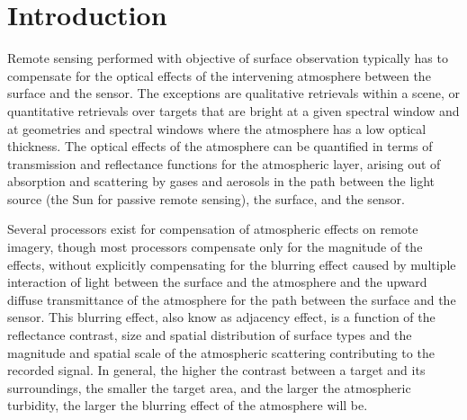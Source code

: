 \chapter{Introduction} \label{ch:intro}

Remote sensing performed with objective of surface observation typically has to compensate for the optical effects of the intervening atmosphere between the surface and the sensor. The exceptions are qualitative retrievals within a scene, or quantitative retrievals over targets that are bright at a given spectral window and at geometries and spectral windows where the atmosphere has a low optical thickness. The optical effects of the atmosphere can be quantified in terms of transmission and reflectance functions for the atmospheric layer, arising out of absorption and scattering by gases and aerosols in the path between the light source (the Sun for passive remote sensing), the surface, and the sensor.

Several processors exist for compensation of atmospheric effects on remote imagery, though most processors compensate only for the magnitude of the effects, without explicitly compensating for the blurring effect caused by multiple interaction of light between the surface and the atmosphere and the upward diffuse transmittance of the atmosphere for the path between the surface and the sensor. This blurring effect, also know as adjacency effect, is a function of the reflectance contrast, size and spatial distribution of surface types and the magnitude and spatial scale of the atmospheric scattering contributing to the recorded signal. In general, the higher the contrast between a target and its surroundings, the smaller the target area, and the larger the atmospheric turbidity, the larger the blurring effect of the atmosphere will be.

